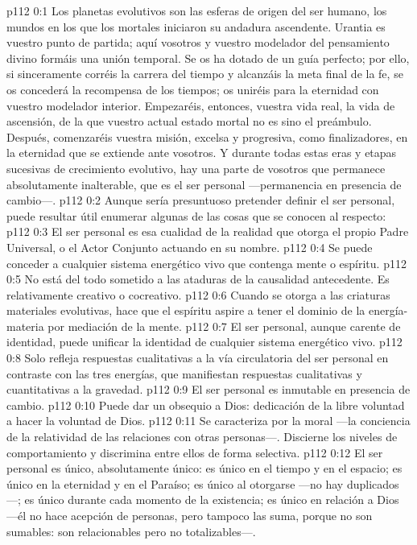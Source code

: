 \author{Mensajero solitario}
\vs p112 0:1 Los planetas evolutivos son las esferas de origen del ser humano, los mundos en los que los mortales iniciaron su andadura ascendente. Urantia es vuestro punto de partida; aquí vosotros y vuestro modelador del pensamiento divino formáis una unión temporal. Se os ha dotado de un guía perfecto; por ello, si sinceramente corréis la carrera del tiempo y alcanzáis la meta final de la fe, se os concederá la recompensa de los tiempos; os uniréis para la eternidad con vuestro modelador interior. Empezaréis, entonces, vuestra vida real, la vida de ascensión, de la que vuestro actual estado mortal no es sino el preámbulo. Después, comenzaréis vuestra misión, excelsa y progresiva, como finalizadores, en la eternidad que se extiende ante vosotros. Y durante todas estas eras y etapas sucesivas de crecimiento evolutivo, hay una parte de vosotros que permanece absolutamente inalterable, que es el ser personal ---permanencia en presencia de cambio---.
\vs p112 0:2 \pc Aunque sería presuntuoso pretender definir el ser personal, puede resultar útil enumerar algunas de las cosas que se conocen al respecto:
\vs p112 0:3 El ser personal es esa cualidad de la realidad que otorga el propio Padre Universal, o el Actor Conjunto actuando en su nombre.
\vs p112 0:4 Se puede conceder a cualquier sistema energético vivo que contenga mente o espíritu.
\vs p112 0:5 No está del todo sometido a las ataduras de la causalidad antecedente. Es relativamente creativo o cocreativo.
\vs p112 0:6 Cuando se otorga a las criaturas materiales evolutivas, hace que el espíritu aspire a tener el dominio de la energía\hyp{}materia por mediación de la mente.
\vs p112 0:7 El ser personal, aunque carente de identidad, puede unificar la identidad de cualquier sistema energético vivo.
\vs p112 0:8 Solo refleja respuestas cualitativas a la vía circulatoria del ser personal en contraste con las tres energías, que manifiestan respuestas cualitativas y cuantitativas a la gravedad.
\vs p112 0:9 El ser personal es inmutable en presencia de cambio.
\vs p112 0:10 Puede dar un obsequio a Dios: dedicación de la libre voluntad a hacer la voluntad de Dios.
\vs p112 0:11 Se caracteriza por la moral ---la conciencia de la relatividad de las relaciones con otras personas---. Discierne los niveles de comportamiento y discrimina entre ellos de forma selectiva.
\vs p112 0:12 El ser personal es único, absolutamente único: es único en el tiempo y en el espacio; es único en la eternidad y en el Paraíso; es único al otorgarse ---no hay duplicados---; es único durante cada momento de la existencia; es único en relación a Dios ---él no hace acepción de personas, pero tampoco las suma, porque no son sumables: son relacionables pero no totalizables---.
